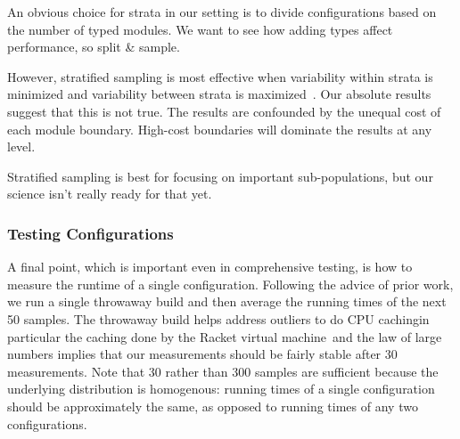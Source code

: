 \documentclass{article}
\begin{document}
An obvious choice for strata in our setting is to divide configurations based on the number of typed modules.
We want to see how adding types affect performance, so split \& sample.

However, stratified sampling is most effective when variability within strata is minimized and variability between strata is maximized~\cite{wikip}.
Our absolute results suggest that this is not true.
The results are confounded by the unequal cost of each module boundary.
High-cost boundaries will dominate the results at any level.

Stratified sampling is best for focusing on important sub-populations, but our science isn't really ready for that yet.


\subsubsection{Testing Configurations} %
A final point, which is important even in comprehensive testing, is how to measure the runtime of a single configuration.
Following the advice of prior work, we run a single throwaway build and then average the running times of the next 50 samples.
The throwaway build helps address outliers to do CPU caching\textemdash in particular the caching done by the Racket virtual machine~\cite{todo}\textemdash and the law of large numbers implies that our measurements should be fairly stable after 30 measurements.
Note that 30 rather than 300 samples are sufficient because the underlying distribution is homogenous: running times of a single configuration should be approximately the same, as opposed to running times of any two configurations.
\end{document}
